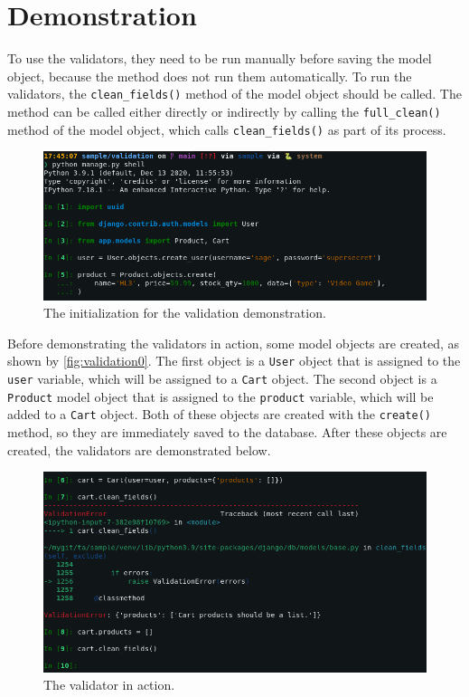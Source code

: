 \section{Demonstration}

To use the validators, they need to be run manually before saving the model
object, because the method does not run them automatically. To run the
validators, the \verb|clean_fields()| method of the model object should be
called. The method can be called either directly or indirectly by calling the
\verb|full_clean()| method of the model object, which calls
\verb|clean_fields()| as part of its process.

\begin{figure}
	\centering
    \includegraphics[width=1.00\textwidth]{pics/validation0.png}
	\caption{The initialization for the validation demonstration.}
	\label{fig:validation0}
\end{figure}

Before demonstrating the validators in action, some model objects are created,
as shown by \autoref{fig:validation0}. The first object is a \verb|User| object
that is assigned to the \verb|user| variable, which will be assigned to a
\verb|Cart| object. The second object is a \verb|Product| model object that is
assigned to the \verb|product| variable, which will be added to a \verb|Cart|
object. Both of these objects are created with the \verb|create()| method,
so they are immediately saved to the database. After these objects are created,
the validators are demonstrated below.

\begin{figure}
	\centering
    \includegraphics[width=1.00\textwidth]{pics/validation1.png}
	\caption{The  validator in action.}
	\label{fig:validation1}
\end{figure}

